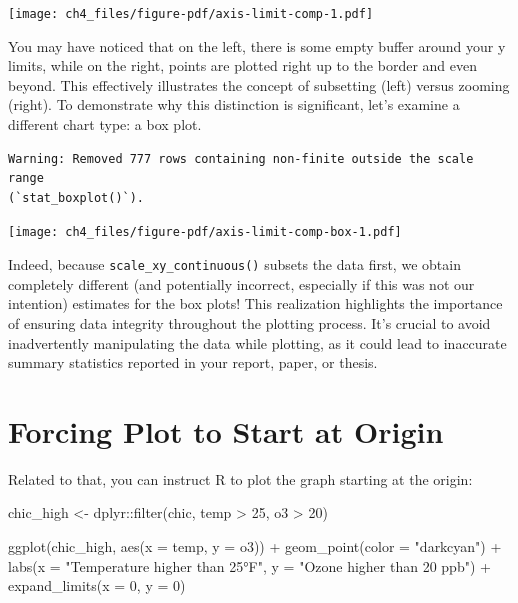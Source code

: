 \documentclass[
  letterpaper,
  DIV=11,
  numbers=noendperiod]{scrreprt}
\newenvironment{Shaded}{\begin{snugshade}}{\end{snugshade}}
\newcommand{\AttributeTok}[1]{\textcolor[rgb]{0.40,0.45,0.13}{#1}}
\newcommand{\DecValTok}[1]{\textcolor[rgb]{0.68,0.00,0.00}{#1}}
\newcommand{\FunctionTok}[1]{\textcolor[rgb]{0.28,0.35,0.67}{#1}}
\newcommand{\NormalTok}[1]{\textcolor[rgb]{0.00,0.23,0.31}{#1}}
\newcommand{\OtherTok}[1]{\textcolor[rgb]{0.00,0.23,0.31}{#1}}
\newcommand{\SpecialCharTok}[1]{\textcolor[rgb]{0.37,0.37,0.37}{#1}}
\newcommand{\StringTok}[1]{\textcolor[rgb]{0.13,0.47,0.30}{#1}}
\begin{document}
\texttt{[image: ch4\_files/figure-pdf/axis-limit-comp-1.pdf]}

You may have noticed that on the left, there is some empty buffer around
your y limits, while on the right, points are plotted right up to the
border and even beyond. This effectively illustrates the concept of
subsetting (left) versus zooming (right). To demonstrate why this
distinction is significant, let's examine a different chart type: a box
plot.

\begin{verbatim}
Warning: Removed 777 rows containing non-finite outside the scale range
(`stat_boxplot()`).
\end{verbatim}

\texttt{[image: ch4\_files/figure-pdf/axis-limit-comp-box-1.pdf]}

Indeed, because \texttt{scale\_x\textbar{}y\_continuous()} subsets the
data first, we obtain completely different (and potentially incorrect,
especially if this was not our intention) estimates for the box plots!
This realization highlights the importance of ensuring data integrity
throughout the plotting process. It's crucial to avoid inadvertently
manipulating the data while plotting, as it could lead to inaccurate
summary statistics reported in your report, paper, or thesis.

\section{Forcing Plot to Start at
Origin}\label{forcing-plot-to-start-at-origin}

Related to that, you can instruct R to plot the graph starting at the
origin:

\begin{Shaded}
\begin{Highlighting}[]
\NormalTok{chic\_high }\OtherTok{\textless{}{-}}\NormalTok{ dplyr}\SpecialCharTok{::}\FunctionTok{filter}\NormalTok{(chic, temp }\SpecialCharTok{\textgreater{}} \DecValTok{25}\NormalTok{, o3 }\SpecialCharTok{\textgreater{}} \DecValTok{20}\NormalTok{)}

\FunctionTok{ggplot}\NormalTok{(chic\_high, }\FunctionTok{aes}\NormalTok{(}\AttributeTok{x =}\NormalTok{ temp, }\AttributeTok{y =}\NormalTok{ o3)) }\SpecialCharTok{+}
  \FunctionTok{geom\_point}\NormalTok{(}\AttributeTok{color =} \StringTok{"darkcyan"}\NormalTok{) }\SpecialCharTok{+}
  \FunctionTok{labs}\NormalTok{(}\AttributeTok{x =} \StringTok{"Temperature higher than 25°F"}\NormalTok{,}
       \AttributeTok{y =} \StringTok{"Ozone higher than 20 ppb"}\NormalTok{) }\SpecialCharTok{+}
  \FunctionTok{expand\_limits}\NormalTok{(}\AttributeTok{x =} \DecValTok{0}\NormalTok{, }\AttributeTok{y =} \DecValTok{0}\NormalTok{)}
\end{Highlighting}
\end{Shaded}
\end{document}
